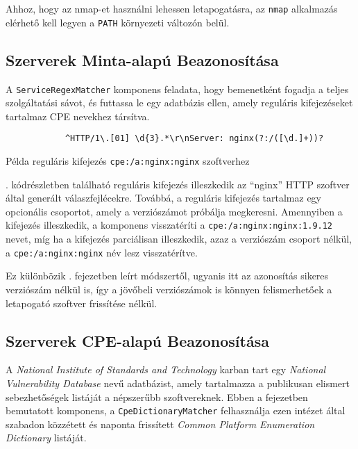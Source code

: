 	Ahhoz, hogy az nmap-et használni lehessen letapogatásra, az \texttt{nmap} alkalmazás elérhető kell legyen a \texttt{PATH} környezeti változón belül.

\subsection*{Szerverek Minta-alapú Beazonosítása}

	A \texttt{ServiceRegexMatcher} komponens feladata, hogy bemenetként fogadja a teljes szolgáltatási sávot, és futtassa le egy adatbázis ellen, amely reguláris kifejezéseket tartalmaz CPE nevekhez társítva.

	\begin{listing}[H]
		\begin{verbatim}
			^HTTP/1\.[01] \d{3}.*\r\nServer: nginx(?:/([\d.]+))?
		\end{verbatim}
		\caption{Példa reguláris kifejezés \texttt{cpe:/a:nginx:nginx} szoftverhez}
		\label{nginxregex_hu}
	\end{listing}
	
	\Az{\ref{nginxregex_hu}}. kódrészletben található reguláris kifejezés illeszkedik az ``nginx'' HTTP szoftver által generált válaszfejlécekre. Továbbá, a reguláris kifejezés tartalmaz egy opcionális csoportot, amely a verziószámot próbálja megkeresni. Amennyiben a kifejezés illeszkedik, a komponens visszatéríti a \texttt{cpe:/a:nginx:nginx:1.9.12} nevet, míg ha a kifejezés parciálisan illeszkedik, azaz a verziószám csoport nélkül, a \texttt{cpe:/a:nginx:nginx} név lesz visszatérítve.
	
	Ez különbözik \az{\ref{matchcpe}}. fejezetben leírt módszertől, ugyanis itt az azonosítás sikeres verziószám nélkül is, így a jövőbeli verziószámok is könnyen felismerhetőek a letapogató szoftver frissítése nélkül.
	
\subsection*{Szerverek CPE-alapú Beazonosítása}

	A \textit{National Institute of Standards and Technology} karban tart egy \textit{National Vulnerability Database} nevű adatbázist, amely tartalmazza a publikusan elismert sebezhetőségek listáját a népszerűbb szoftvereknek. Ebben a fejezetben bemutatott komponens, a \texttt{CpeDictionaryMatcher} felhasználja ezen intézet által szabadon közzétett és naponta frissített \textit{Common Platform Enumeration Dictionary} listáját.
	

